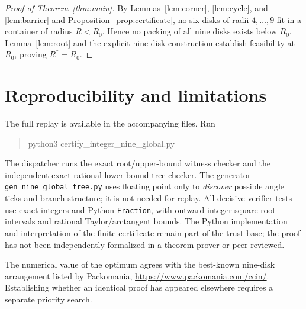 \documentclass[11pt,a4paper]{article}
\newcommand{\Rzero}{R_0}
\begin{document}
\begin{proof}[Proof of Theorem~\ref{thm:main}]
By Lemmas~\ref{lem:corner}, \ref{lem:cycle}, and \ref{lem:barrier} and Proposition~\ref{prop:certificate}, no six disks of radii $4,\ldots,9$ fit in a container of radius $R<\Rzero$. Hence no packing of all nine disks exists below $\Rzero$. Lemma~\ref{lem:root} and the explicit nine-disk construction establish feasibility at $\Rzero$, proving $R^*=\Rzero$.
\end{proof}

\section{Reproducibility and limitations}
The full replay is available in the accompanying files. Run
\begin{quote}\small\ttfamily
python3 certify\_integer\_nine\_global.py
\end{quote}
The dispatcher runs the exact root/upper-bound witness checker and the independent exact rational lower-bound tree checker. The generator \texttt{gen\_nine\_global\_tree.py} uses floating point only to \emph{discover} possible angle ticks and branch structure; it is not needed for replay. All decisive verifier tests use exact integers and Python \texttt{Fraction}, with outward integer-square-root intervals and rational Taylor/arctangent bounds. The Python implementation and interpretation of the finite certificate remain part of the trust base; the proof has not been independently formalized in a theorem prover or peer reviewed.

The numerical value of the optimum agrees with the best-known nine-disk arrangement listed by Packomania, \url{https://www.packomania.com/ccin/}. Establishing whether an identical proof has appeared elsewhere requires a separate priority search.
\end{document}
